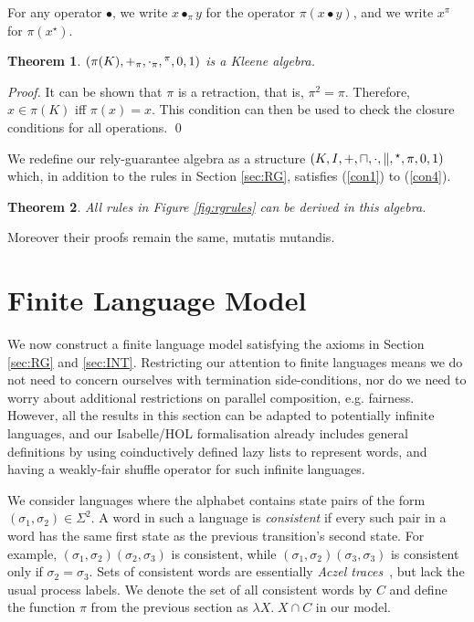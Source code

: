 \documentclass{llncs}
\newtheorem{thm}{Theorem}
\begin{document}
For any operator $\bullet$, we write $x \bullet_\pi y$ for the
operator $\pi(x\bullet y)$, and we write $x^\pi$ for
$\pi(x^\star)$.
\begin{thm}
$(\pi(K), +_\pi, \cdot_\pi, \hphantom{}^\pi,0,1)$ is a Kleene algebra.
\end{thm}
\begin{proof}
  It can be shown that $\pi$ is a retraction, that is, $\pi^2 =
  \pi$. Therefore, $x\in \pi(K)$ iff $\pi(x) = x$. This condition can
  then be used to check the closure conditions for all operations. \qed
\end{proof}

We redefine our rely-guarantee algebra as a structure
$(K,I,+,\sqcap,\cdot,\|,\hphantom{}^\star,\pi,0,1)$ which, in addition
to the rules in Section \ref{sec:RG}, satisfies (\ref{con1}) to
(\ref{con4}).
\begin{thm}
  All rules in Figure \ref{fig:rgrules} can be derived in this
  algebra.
\end{thm}
Moreover their proofs remain the same, mutatis mutandis.

\section{Finite Language Model}
\label{sec:Model}

We now construct a finite language model satisfying the axioms in
Section \ref{sec:RG} and \ref{sec:INT}. Restricting our attention to
finite languages means we do not need to concern ourselves with
termination side-conditions, nor do we need to worry about additional
restrictions on parallel composition, e.g. fairness. However, all the
results in this section can be adapted to potentially infinite
languages, and our Isabelle/HOL formalisation already includes general
definitions by using coinductively defined lazy lists to represent
words, and having a weakly-fair shuffle operator for such infinite
languages.

We consider languages where the alphabet contains state pairs of the
form $(\sigma_1,\sigma_2) \in \Sigma^2$. A word in such a language is
\emph{consistent} if every such pair in a word has the same first
state as the previous transition's second state. For example,
$(\sigma_1,\sigma_2)(\sigma_2,\sigma_3)$ is consistent, while
$(\sigma_1,\sigma_2)(\sigma_3,\sigma_3)$ is consistent only if $\sigma_2 = \sigma_3$. Sets of
consistent words are essentially \emph{Aczel
  traces}~\cite{boer_formal_1999}, but lack the usual process
labels. We denote the set of all consistent words by $C$ and define
the function $\pi$ from the previous section as $\lambda X.\; X \cap
C$ in our model.
\end{document}
